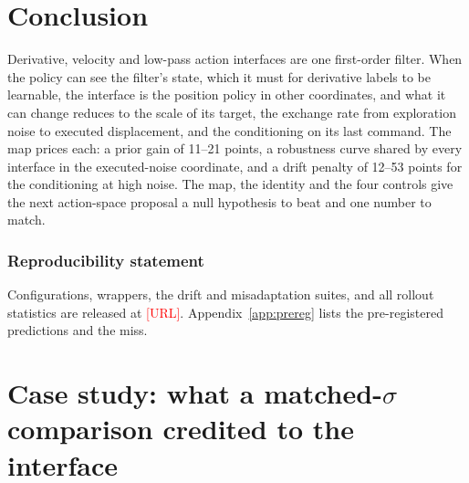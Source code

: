 \documentclass{article}
\newcommand{\todo}[1]{\textcolor{red}{[#1]}}
\begin{document}
\section{Conclusion}

Derivative, velocity and low-pass action interfaces are one first-order filter. When the policy can see the filter's state, which it must for derivative labels to be learnable, the interface is the position policy in other coordinates, and what it can change reduces to the scale of its target, the exchange rate from exploration noise to executed displacement, and the conditioning on its last command. The map prices each: a prior gain of 11--21 points, a robustness curve shared by every interface in the executed-noise coordinate, and a drift penalty of 12--53 points for the conditioning at high noise. The map, the identity and the four controls give the next action-space proposal a null hypothesis to beat and one number to match.

\subsubsection*{Reproducibility statement}
Configurations, wrappers, the drift and misadaptation suites, and all rollout statistics are released at \todo{URL}. Appendix~\ref{app:prereg} lists the pre-registered predictions and the miss.




\appendix

\section{Case study: what a matched-$\sigma$ comparison credited to the interface}
\label{app:casestudy}
\end{document}
